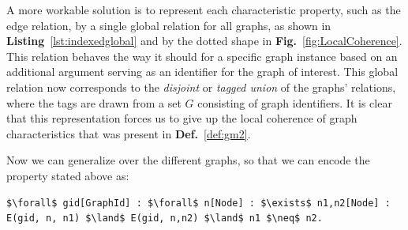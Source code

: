 A more workable solution is to represent each characteristic property, such as the edge relation, by a single global relation for all graphs, as shown in \textbf{Listing}~\ref{lst:indexedglobal} and by the dotted shape in \textbf{Fig.}~\ref{fig:LocalCoherence}.
This relation behaves the way it should for a specific graph instance based on an additional argument serving as an identifier for the graph of interest.
This global relation now corresponds to the \emph{disjoint} or \emph{tagged union} of the graphs' relations, where the tags are drawn from a set $G$ consisting of graph identifiers.
It is clear that this representation forces us to give up the local coherence of graph characteristics that was present in \textbf{Def.}~\ref{def:gm2}.

Now we can generalize over the different graphs, so that we can encode the property stated above as:
\begin{center}
\begin{minipage}{0.95\linewidth}
\begin{lstlisting}[mathescape]
$\forall$ gid[GraphId] : $\forall$ n[Node] : $\exists$ n1,n2[Node] : E(gid, n, n1) $\land$ E(gid, n,n2) $\land$ n1 $\neq$ n2.
\end{lstlisting}
\end{minipage}
\end{center}


